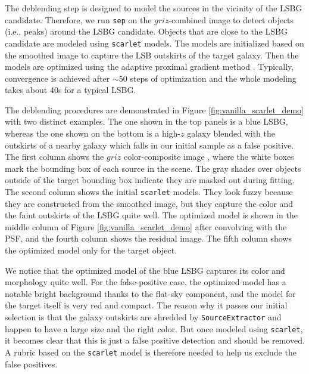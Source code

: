 \documentclass[twocolumn,astrosymb,twocolappendix]{aastex631}
\newcommand{\code}[1]{\texttt{#1}}
\begin{document}
\begin{CJK*}{UTF8}{gbsn}
The deblending step is designed to model the sources in the vicinity of the LSBG candidate. Therefore, we run \code{sep} on the $griz$-combined image to detect objects (i.e., peaks) around the LSBG candidate. Objects that are close to the LSBG candidate are modeled using \code{scarlet} models. The models are initialized based on the smoothed image to capture the LSB outskirts of the target galaxy. Then the models are optimized using the adaptive proximal gradient method \citep{Melchior2019}. Typically, convergence is achieved after $\sim 50$ steps of optimization and the whole modeling takes about 40s for a typical LSBG.

The deblending procedures are demonstrated in Figure \ref{fig:vanilla_scarlet_demo} with two distinct examples. The one shown in the top panels is a blue LSBG, whereas the one shown on the bottom is a high-$z$ galaxy blended with the outskirts of a nearby galaxy which falls in our initial sample as a false positive. The first column shows the $griz$ color-composite image \citep{Lupton2004}, where the white boxes mark the bounding box of each source in the scene. The gray shades over objects outside of the target bounding box indicate they are masked out during fitting. The second column shows the initial \code{scarlet} models. They look fuzzy because they are constructed from the smoothed image, but they capture the color and the faint outskirts of the LSBG quite well. The optimized model is shown in the middle column of Figure \ref{fig:vanilla_scarlet_demo} after convolving with the PSF, and the fourth column shows the residual image. The fifth column shows the optimized model only for the target object. 

We notice that the optimized model of the blue LSBG captures its color and morphology quite well. For the false-positive case, the optimized model has a notable bright background thanks to the flat-sky component, and the model for the target itself is very red and compact. The reason why it passes our initial selection is that the galaxy outskirts are shredded by \code{SourceExtractor} and happen to have a large size and the right color. But once modeled using \code{scarlet}, it becomes clear that this is just a false positive detection and should be removed. A rubric based on the \code{scarlet} model is therefore needed to help us exclude the false positives. 



\end{CJK*}
\end{document}
